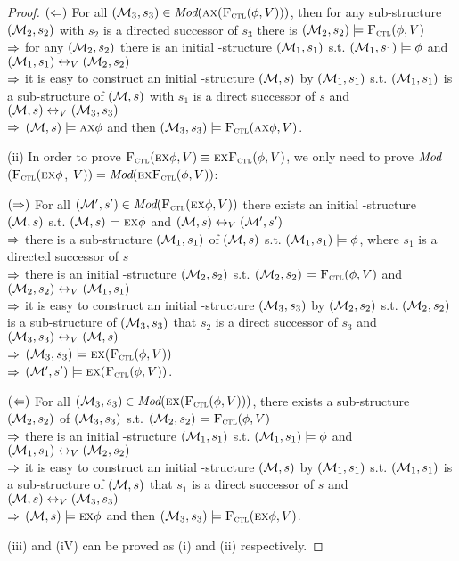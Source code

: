 \documentclass{article}
\begin{document}
\begin{proof}
 $(\Leftarrow)$ For all $({\cal M}_3, s_3) \in \textit{Mod}(\textsc{a} \textsc{x} ({\textsc{F}_{\textsc{ctl}}}(\phi,V)))$, then for any sub-structure $({\cal M}_2, s_2)$ with $s_2$ is a directed successor of $s_3$ there is $({\cal M}_2, s_2) \models {\textsc{F}_{\textsc{ctl}}}(\phi,V)$\\
 $\Rightarrow$ for any $({\cal M}_2, s_2)$ there is an initial \MPK-structure $({\cal M}_1, s_1)$ s.t. $({\cal M}_1, s_1) \models \phi$ and $({\cal M}_1, s_1) \leftrightarrow_V ({\cal M}_2, s_2)$\\
 $\Rightarrow$ it is easy to construct an initial \MPK-structure $({\cal M},s)$ by $({\cal M}_1, s_1)$ s.t. $({\cal M}_1, s_1)$ is a sub-structure of $({\cal M}, s)$ with $s_1$ is a direct successor of $s$ and $({\cal M}, s)\leftrightarrow_V ({\cal M}_3, s_3)$\\
 $\Rightarrow$ $({\cal M}, s) \models \textsc{a} \textsc{x} \phi$ and then $({\cal M}_3, s_3) \models {\textsc{F}_{\textsc{ctl}}}(\textsc{a} \textsc{x} \phi, V)$.


 (ii) In order to prove ${\textsc{F}_{\textsc{ctl}}}(\textsc{e} \textsc{x} \phi, V) \equiv \textsc{e}\textsc{x}{\textsc{F}_{\textsc{ctl}}}(\phi, V)$, we only need to prove $\textit{Mod}$ $({\textsc{F}_{\textsc{ctl}}}(\textsc{e} \textsc{x} \phi$, $V)) = \textit{Mod}( \textsc{e}\textsc{x}{\textsc{F}_{\textsc{ctl}}}(\phi, V))$:

 $(\Rightarrow)$ For all $({\cal M}', s') \in \textit{Mod}({\textsc{F}_{\textsc{ctl}}}(\textsc{e} \textsc{x} \phi, V))$ there exists an initial \MPK-structure $({\cal M}, s)$ s.t. $({\cal M}, s) \models \textsc{e} \textsc{x} \phi$ and $({\cal M}, s) \leftrightarrow_V ({\cal M}',s')$\\
 $\Rightarrow$ there is a sub-structure $({\cal M}_1, s_1)$ of $({\cal M}, s)$ s.t. $({\cal M}_1, s_1) \models \phi$, where $s_1$ is a directed successor of $s$\\
 $\Rightarrow$ there is an initial \MPK-structure $({\cal M}_2, s_2)$ s.t. $({\cal M}_2, s_2) \models {\textsc{F}_{\textsc{ctl}}}(\phi,V)$ and $({\cal M}_2, s_2) \leftrightarrow_V ({\cal M}_1,s_1)$\\
 $\Rightarrow$ it is easy to construct an initial \MPK-structure $({\cal M}_3, s_3)$ by $({\cal M}_2, s_2)$ s.t. $({\cal M}_2, s_2)$ is a sub-structure of $({\cal M}_3, s_3)$ that $s_2$ is a direct successor of $s_3$ and $({\cal M}_3, s_3) \leftrightarrow_V ({\cal M},s)$\\
 $\Rightarrow$ $({\cal M}_3, s_3) \models \textsc{e} \textsc{x} ({\textsc{F}_{\textsc{ctl}}}(\phi,V))$\\
 $\Rightarrow$ $({\cal M}', s') \models \textsc{e} \textsc{x} ({\textsc{F}_{\textsc{ctl}}}(\phi,V))$.

 $(\Leftarrow)$ For all $({\cal M}_3, s_3) \in \textit{Mod}(\textsc{e} \textsc{x} ({\textsc{F}_{\textsc{ctl}}}(\phi,V)))$, there exists a sub-structure $({\cal M}_2, s_2)$ of $({\cal M}_3, s_3)$ s.t. $({\cal M}_2, s_2) \models {\textsc{F}_{\textsc{ctl}}}(\phi,V)$\\
 $\Rightarrow$ there is an initial \MPK-structure $({\cal M}_1, s_1)$ s.t. $({\cal M}_1, s_1) \models \phi$ and $({\cal M}_1, s_1) \leftrightarrow_V ({\cal M}_2, s_2)$\\
 $\Rightarrow$ it is easy to construct an initial \MPK-structure $({\cal M},s)$ by $({\cal M}_1, s_1)$ s.t. $({\cal M}_1, s_1)$ is a sub-structure of $({\cal M}, s)$ that $s_1$ is a direct successor of $s$ and $({\cal M}, s)\leftrightarrow_V ({\cal M}_3, s_3)$\\
 $\Rightarrow$ $({\cal M}, s) \models \textsc{e} \textsc{x} \phi$ and then $({\cal M}_3, s_3) \models {\textsc{F}_{\textsc{ctl}}}(\textsc{e} \textsc{x} \phi, V)$.



 (iii) and (iV) can be proved as (i) and (ii) respectively.
 \end{proof}
\end{document}
